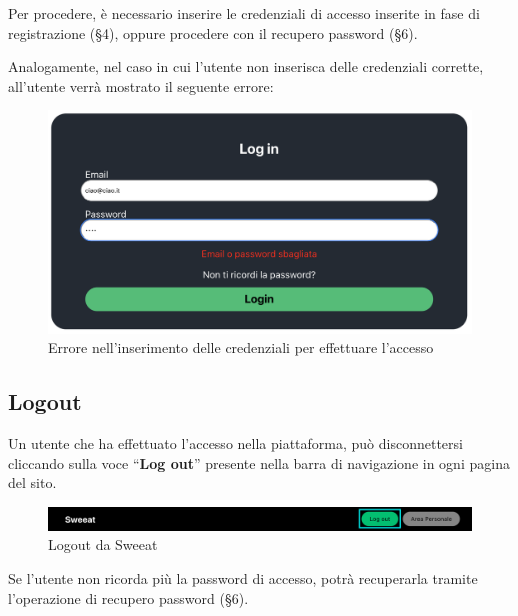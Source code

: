 Per procedere, è necessario inserire le credenziali di accesso inserite in fase di registrazione (\S{4}), oppure procedere con il recupero password (\S{6}). 

Analogamente, nel caso in cui l'utente non inserisca delle credenziali corrette, all'utente verrà mostrato il seguente errore:

\begin{figure}[H]
\centering
\includegraphics[scale=0.3]{./images/Login/AccessoNegato.png} 
\caption{Errore nell'inserimento delle credenziali per effettuare l'accesso}
\end{figure}

\subsection{Logout}

Un utente che ha effettuato l'accesso nella piattaforma, può disconnettersi cliccando sulla voce “\textbf{Log out}” presente nella barra di navigazione in ogni pagina del sito.

\begin{figure}[H]
\centering
\includegraphics[scale=0.15]{./images/Login/Logout.png} 
\caption{Logout da Sweeat}
\end{figure}

Se l'utente non ricorda più la password di accesso, potrà recuperarla tramite l'operazione di recupero password (\S{6}).